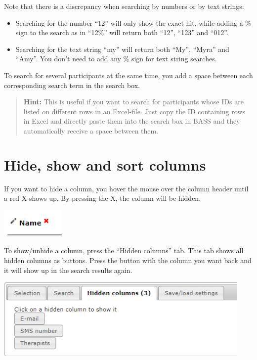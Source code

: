 \documentclass[
]{book}
\begin{document}
Note that there is a discrepancy when searching by numbers or by text strings:

\begin{itemize}
\item
  Searching for the number ``12'' will only show the exact hit, while adding a \% sign to the search as in ``12\%'' will return both ``12'', ``123'' and ``012''.
\item
  Searching for the text string ``my'' will return both ``My'', ``Myra'' and ``Amy''. You don't need to add any \% sign for text string searches.
\end{itemize}

To search for several participants at the same time, you add a space between each corresponding search term in the search box.

\begin{quote}
\textbf{Hint:} This is useful if you want to search for participants whose IDs are listed on different rows in an Excel-file. Just copy the ID containing rows in Excel and directly paste them into the search box in BASS and they automatically receive a space between them.
\end{quote}

\section{Hide, show and sort columns}\label{hide-show-and-sort-columns}

If you want to hide a column, you hover the mouse over the column header until a red X shows up. By pressing the X, the column will be hidden.

\includegraphics{images/hide-show-sort.png}

To show/unhide a column, press the ``Hidden columns'' tab. This tab shows all hidden columns as buttons. Press the button with the column you want back and it will show up in the search results again.

\includegraphics{images/hidden-columns.png}
\end{document}
